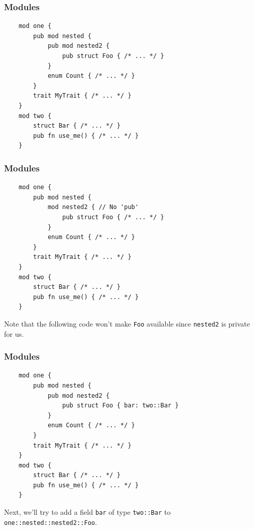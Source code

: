 \documentclass[aspectratio=1610,t]{beamer}
\begin{document}

\begin{frame}[fragile]
\frametitle{Modules}
\begin{verbatim}
    mod one {
        pub mod nested {
            pub mod nested2 {
                pub struct Foo { /* ... */ }
            }
            enum Count { /* ... */ }
        }
        trait MyTrait { /* ... */ }
    }
    mod two {
        struct Bar { /* ... */ }
        pub fn use_me() { /* ... */ }
    }
\end{verbatim}
\end{frame}


\begin{frame}[fragile]
\frametitle{Modules}
\begin{verbatim}
    mod one {
        pub mod nested {
            mod nested2 { // No 'pub'
                pub struct Foo { /* ... */ }
            }
            enum Count { /* ... */ }
        }
        trait MyTrait { /* ... */ }
    }
    mod two {
        struct Bar { /* ... */ }
        pub fn use_me() { /* ... */ }
    }
\end{verbatim}

Note that the following code won't make \texttt{Foo} available since \texttt{nested2} is private for us.
\end{frame}


\begin{frame}[fragile]
\frametitle{Modules}
\begin{verbatim}
    mod one {
        pub mod nested {
            pub mod nested2 {
                pub struct Foo { bar: two::Bar }
            }
            enum Count { /* ... */ }
        }
        trait MyTrait { /* ... */ }
    }
    mod two {
        struct Bar { /* ... */ }
        pub fn use_me() { /* ... */ }
    }
\end{verbatim}

Next, we'll try to add a field \texttt{bar} of type \texttt{two::Bar} to \texttt{one::nested::nested2::Foo}.
\end{frame}

\end{document}

